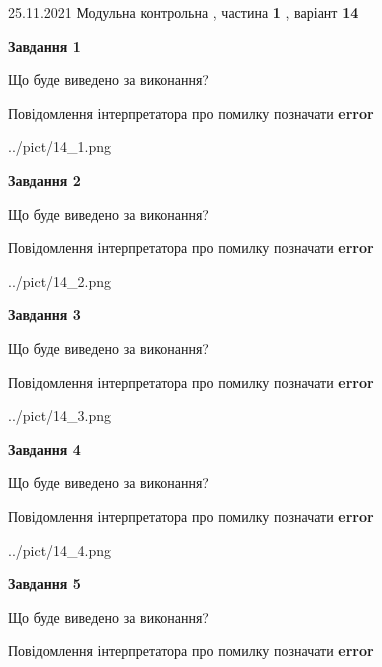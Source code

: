\documentclass[10pt, ukrainian]{article}
\begin{document}
{25.11.2021 Модульна контрольна , частина \textbf { 1 }, варіант  \No \textbf { 14 }\par}
{
\begin {large}

{\begin {center}\textbf{Завдання 1}\end {center}}\par
Що буде виведено за виконання? \par
Повідомлення інтерпретатора про помилку позначати \textbf{error}

\begin{center}
	{../pict/14_1.png}
\end{center}
\newpage

{\begin {center}\textbf{Завдання 2}\end {center}}\par
Що буде виведено за виконання? \par
Повідомлення інтерпретатора про помилку позначати \textbf{error}

\begin{center}
	{../pict/14_2.png}
\end{center}
\newpage

{\begin {center}\textbf{Завдання 3}\end {center}}\par
Що буде виведено за виконання? \par
Повідомлення інтерпретатора про помилку позначати \textbf{error}

\begin{center}
	{../pict/14_3.png}
\end{center}
\newpage

{\begin {center}\textbf{Завдання 4}\end {center}}\par
Що буде виведено за виконання? \par
Повідомлення інтерпретатора про помилку позначати \textbf{error}

\begin{center}
	{../pict/14_4.png}
\end{center}
\newpage

{\begin {center}\textbf{Завдання 5}\end {center}}\par
Що буде виведено за виконання? \par
Повідомлення інтерпретатора про помилку позначати \textbf{error}


\end{large}}
\end{document}
